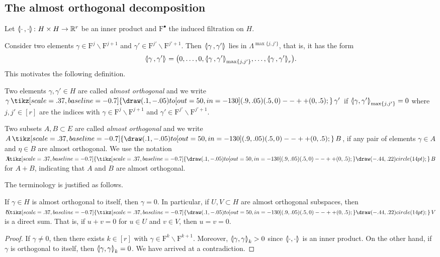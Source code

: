 \documentclass[AHL,Unicode,longabstracts]{cedram}
\newcommand{\symbuptm}{\tikz[scale=.37, baseline=-0.7]{\draw(.1,-.05)to[out=50,in=-130](.9,.05) (.5,0)--++(0,.5);}}
\newcommand{\almorth}{\tikz[scale=.37, baseline=-0.7]{\symbuptm \draw (-.44,.22) circle (14pt);}}
\newcommand{\aplus}{\hspace{-.2cm}\almorth\,}
\newcommand{\aperp}{\,\symbuptm\,}
\newcommand{\llangle}{\mathopen{\langle\mkern -3.1mu\lvert}}
\newcommand{\rrangle}{\mathclose{\rvert\mkern -3.1mu\rangle}}
\newcommand{\highinn}[2]{{\llangle#2\rrangle_{#1}}}
\newcommand{\filter}{\mathrm{F}}
\newcommand{\R}{\mathbb{R}}
\renewcommand{\setminus}{\smallsetminus}
\renewcommand*{\to}{\mathchoice{\longrightarrow}{\rightarrow}{\rightarrow}{\rightarrow}}
\begin{document}
\subsection{The almost orthogonal decomposition} \label{ss:AlmostOrthogonalDecomposition}
Let $\highinn{}{\cdot\,,\cdot} \colon H \times H \to \R^r$ be an inner product and $\filter^\bullet$ the induced filtration on $H$.



Consider two elements $\gamma \in \filter^{j} \setminus \filter^{j+1}$ and $\gamma' \in \filter^{j'} \setminus \filter^{j'+1}$. Then $\highinn{}{\gamma\,,\gamma'}$ lies in ${\Lambda}^{\max\{j, j'\}}$, that is, it has the form
\[
\highinn{}{\gamma\,,\gamma'} = \bigl(0, \dots, 0, \highinn{\max\{j, j'\}}{\gamma\,,\gamma'}, \dots, \highinn{r}{\gamma\,,\gamma'} \bigr).
\]
This motivates the following definition.

\begin{defi}
Two elements $\gamma, \gamma' \in H$ are called \emph{almost orthogonal} and we write $\gamma \aperp\gamma'$ if $\highinn{\max\{j,j'\}}{\gamma, \gamma'} = 0$ where $j, j' \in [r]$ are the indices with $\gamma \in \filter^j \setminus \filter^{j+1}$ and $\gamma' \in \filter^{j'} \setminus \filter^{j'+1}$.

Two subsets $A, B \subset E$ are called \emph{almost orthogonal} and we write $A \aperp B$, if any pair of elements $\gamma \in A$ and $\eta \in B$ are almost orthogonal. We use the notation $A \aplus B$ for $A+B$, indicating that $A$ and $B$ are almost orthogonal.%
\end{defi}

The terminology is justified as follows.

\begin{lemm}\label{lem:orthogonality_vanishing}
If $\gamma \in H$ is almost orthogonal to itself, then $\gamma = 0$. In particular, if $U, V \subset H$ are almost orthogonal subspaces, then $U \aplus V$ is a direct sum. That is, if $u+v = 0$ for $u\in U$ and $v \in V$, then $u=v = 0$.
\end{lemm}

\begin{proof}
If $\gamma \neq 0$, then there exists $k \in [r]$ with $\gamma \in \filter^k \smallsetminus \filter^{k+1}$. Moreover, $\highinn{k}{\gamma, \gamma} >0$ since $\highinn{}{\cdot, \cdot}$ is an inner product. On the other hand, if $\gamma$ is orthogonal to itself, then $\highinn{k}{\gamma, \gamma} =0$. We have arrived at a contradiction.
\end{proof}
\end{document}
